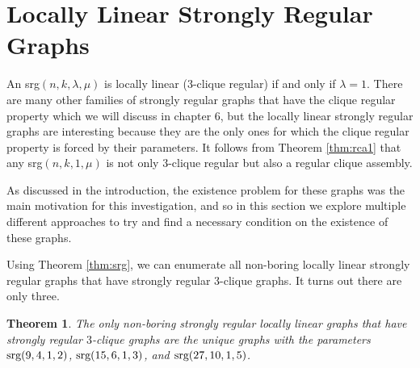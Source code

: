 \documentclass[12pt]{report}
\newtheorem{thm}{Theorem}[chapter]
\theoremstyle{definition}
\begin{document}
\section{Locally Linear Strongly Regular Graphs}\label{sec:localsrgs}
An srg$(n,k,\lambda, \mu)$ is locally linear (3-clique regular) if and only if $\lambda=1$. There are many other families of strongly regular graphs that have the clique regular property which we will discuss in chapter 6, but the locally linear strongly regular graphs are interesting because they are the only ones for which the clique regular property is forced by their parameters. It follows from Theorem \ref{thm:rca1} that any srg$(n,k,1,\mu)$ is not only 3-clique regular but also a regular clique assembly.\par
As discussed in the introduction, the existence problem for these graphs was the main motivation for this investigation, and so in this section we explore multiple different approaches to try and find a necessary condition on the existence of these graphs. \par
Using Theorem \ref{thm:srg}, we can enumerate all non-boring locally linear strongly regular graphs that have strongly regular 3-clique graphs. It turns out there are only three.
 \begin{thm}\label{thm:3srgs}
     The only non-boring strongly regular locally linear graphs that have strongly regular $3$-clique graphs are the unique graphs with the parameters $\textnormal{srg}(9,4,1,2)$, $\textnormal{srg}(15,6,1,3)$, and $\textnormal{srg}(27, 10, 1, 5)$.
 \end{thm}
\end{document}
